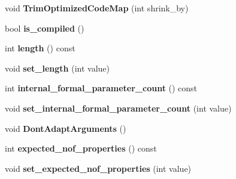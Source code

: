 \begin{DoxyCompactItemize}
\item 
void {\bfseries Trim\+Optimized\+Code\+Map} (int shrink\+\_\+by)\hypertarget{classv8_1_1internal_1_1_shared_function_info_ab0e3cd62858a2394f533da95818beae8}{}\label{classv8_1_1internal_1_1_shared_function_info_ab0e3cd62858a2394f533da95818beae8}

\item 
bool {\bfseries is\+\_\+compiled} ()\hypertarget{classv8_1_1internal_1_1_shared_function_info_aa02713f6cd385a3556cd17d902124d7a}{}\label{classv8_1_1internal_1_1_shared_function_info_aa02713f6cd385a3556cd17d902124d7a}

\item 
int {\bfseries length} () const \hypertarget{classv8_1_1internal_1_1_shared_function_info_a5e0cb651f734ab89a4854a569c4d3f27}{}\label{classv8_1_1internal_1_1_shared_function_info_a5e0cb651f734ab89a4854a569c4d3f27}

\item 
void {\bfseries set\+\_\+length} (int value)\hypertarget{classv8_1_1internal_1_1_shared_function_info_a6e17b5750109e31cce11bacb15cd8765}{}\label{classv8_1_1internal_1_1_shared_function_info_a6e17b5750109e31cce11bacb15cd8765}

\item 
int {\bfseries internal\+\_\+formal\+\_\+parameter\+\_\+count} () const \hypertarget{classv8_1_1internal_1_1_shared_function_info_a975bb154cfbd84be094a4c00f07e7eb7}{}\label{classv8_1_1internal_1_1_shared_function_info_a975bb154cfbd84be094a4c00f07e7eb7}

\item 
void {\bfseries set\+\_\+internal\+\_\+formal\+\_\+parameter\+\_\+count} (int value)\hypertarget{classv8_1_1internal_1_1_shared_function_info_ac743ed67ef1826212573bb8ee0a6f5db}{}\label{classv8_1_1internal_1_1_shared_function_info_ac743ed67ef1826212573bb8ee0a6f5db}

\item 
void {\bfseries Dont\+Adapt\+Arguments} ()\hypertarget{classv8_1_1internal_1_1_shared_function_info_abb11e938d3999768b4961fcd6806c015}{}\label{classv8_1_1internal_1_1_shared_function_info_abb11e938d3999768b4961fcd6806c015}

\item 
int {\bfseries expected\+\_\+nof\+\_\+properties} () const \hypertarget{classv8_1_1internal_1_1_shared_function_info_a2b5ad3aa181012d500454740cfe2e9ea}{}\label{classv8_1_1internal_1_1_shared_function_info_a2b5ad3aa181012d500454740cfe2e9ea}

\item 
void {\bfseries set\+\_\+expected\+\_\+nof\+\_\+properties} (int value)\hypertarget{classv8_1_1internal_1_1_shared_function_info_a1092a11547a7d3ae10ddefdfc76db8c7}{}\label{classv8_1_1internal_1_1_shared_function_info_a1092a11547a7d3ae10ddefdfc76db8c7}


\end{DoxyCompactItemize}
